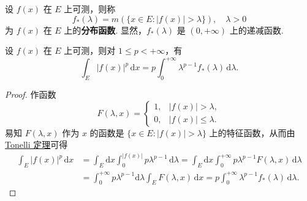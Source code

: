 \documentclass[../../main.tex]{subfiles}
\begin{document}
\begin{definition}[分布函数]
设 \( f(x) \) 在 \( E \) 上可测，则称
\[
f_*(\lambda) = m(\{ x \in E : |f(x)| > \lambda \}), \quad \lambda > 0
\]
为 \( f(x) \) 在 \( E \) 上的\textbf{分布函数}. 显然，\( f_*(\lambda) \) 是 \( (0, +\infty) \) 上的递减函数.
\end{definition}

\begin{theorem}
设 \( f(x) \) 在 \( E \) 上可测，则对 \( 1 \leq p < +\infty \)，有
\[
\int_E |f(x)|^p \, \mathrm{d}x = p \int_0^{+\infty} \lambda^{p - 1} f_*(\lambda) \, \mathrm{d}\lambda. \tag{4.17}
\]
\end{theorem}
\begin{proof}
作函数
\[
F(\lambda, x) = 
\begin{cases} 
1, & |f(x)| > \lambda, \\
0, & |f(x)| \leq \lambda.
\end{cases}
\]
易知 \( F(\lambda, x) \) 作为 \( x \) 的函数是 \( \{ x \in E : |f(x)| > \lambda \} \) 上的特征函数，从而由 \hyperref[theorem:Tonelli 定理 非负可测函数的情形]{Tonelli 定理}可得
\begin{align*}
\int_E |f(x)|^p \, \mathrm{d}x &= \int_E \mathrm{d}x \int_0^{|f(x)|} p\lambda^{p - 1} \, \mathrm{d}\lambda = \int_E \mathrm{d}x \int_0^{+\infty} p\lambda^{p - 1} F(\lambda, x) \, \mathrm{d}\lambda \\
&= \int_0^{+\infty} p\lambda^{p - 1} \mathrm{d}\lambda \int_E F(\lambda, x) \, \mathrm{d}x = p \int_0^{+\infty} \lambda^{p - 1} f_*(\lambda) \, \mathrm{d}\lambda.
\end{align*}
\end{proof}
\end{document}

